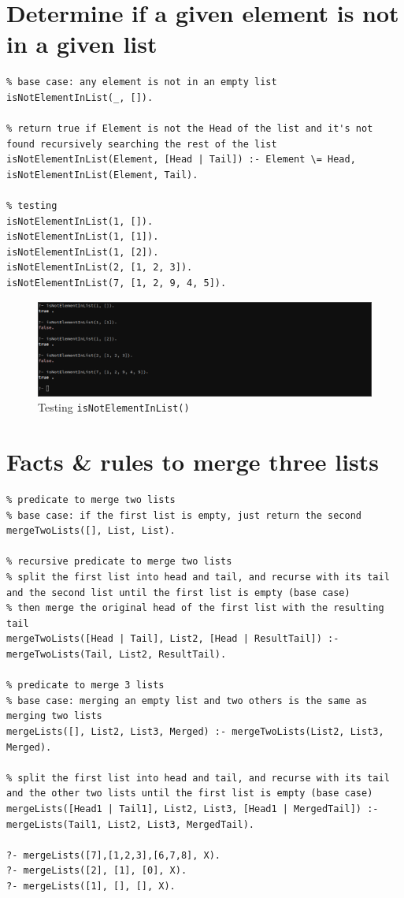 \documentclass[a4paper]{article}
\begin{document}
\section{Determine if a given element is not in a given list}
\begin{verbatim}
% base case: any element is not in an empty list
isNotElementInList(_, []).

% return true if Element is not the Head of the list and it's not found recursively searching the rest of the list
isNotElementInList(Element, [Head | Tail]) :- Element \= Head, isNotElementInList(Element, Tail).

% testing
isNotElementInList(1, []).  
isNotElementInList(1, [1]). 
isNotElementInList(1, [2]).  
isNotElementInList(2, [1, 2, 3]).  
isNotElementInList(7, [1, 2, 9, 4, 5]). 
\end{verbatim}

\begin{figure}[H]
    \includegraphics[width=\textwidth]{./images/q3.png}
    \caption{Testing \texttt{isNotElementInList()}}
\end{figure}

\section{Facts \& rules to merge three lists}
\begin{verbatim}
% predicate to merge two lists
% base case: if the first list is empty, just return the second
mergeTwoLists([], List, List).

% recursive predicate to merge two lists
% split the first list into head and tail, and recurse with its tail and the second list until the first list is empty (base case)
% then merge the original head of the first list with the resulting tail
mergeTwoLists([Head | Tail], List2, [Head | ResultTail]) :- mergeTwoLists(Tail, List2, ResultTail).

% predicate to merge 3 lists 
% base case: merging an empty list and two others is the same as merging two lists
mergeLists([], List2, List3, Merged) :- mergeTwoLists(List2, List3, Merged).

% split the first list into head and tail, and recurse with its tail and the other two lists until the first list is empty (base case)
mergeLists([Head1 | Tail1], List2, List3, [Head1 | MergedTail]) :- mergeLists(Tail1, List2, List3, MergedTail).

?- mergeLists([7],[1,2,3],[6,7,8], X).
?- mergeLists([2], [1], [0], X).
?- mergeLists([1], [], [], X).
\end{verbatim}
\end{document}
